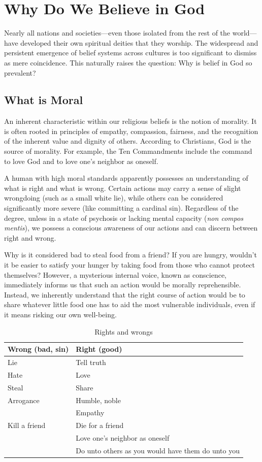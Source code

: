 \chapter{Why Do We Believe in God}
\label{chap:why-do-we-believe}

Nearly all nations and societies—even those isolated from the rest of the world—have developed their own spiritual deities that they worship. 
The widespread and persistent emergence of belief systems across cultures is too significant to dismiss as mere coincidence. 
This naturally raises the question: Why is belief in God so prevalent?

\section{What is Moral}

An inherent characteristic within our religious beliefs is the
notion of morality. It is often rooted in principles of empathy,
compassion, fairness, and the recognition of the inherent value
and dignity of others. According to Christians, God is the source
of morality. For example, the Ten Commandments include the command
to love God and to love one's neighbor as oneself.

A human with high moral standards apparently possesses an
understanding of what is right and what is wrong. Certain actions
may carry a sense of slight wrongdoing (such as a small white lie),
while others can be considered significantly more severe (like
committing a cardinal sin). Regardless of the degree, unless in a
state of psychosis or lacking mental capacity (\emph{non compos mentis}),
we possess a conscious awareness of our actions and can discern
between right and wrong.

Why is it considered bad to steal food from a friend? If you are
hungry, wouldn't it be easier to satisfy your hunger by taking food
from those who cannot protect themselves? However, a mysterious
internal voice, known as conscience, immediately informs us that
such an action would be morally reprehensible. Instead, we
inherently understand that the right course of action would be to
share whatever little food one has to aid the most vulnerable
individuals, even if it means risking our own well-being.

\begin{table}[h]
\centering
\caption{Rights and wrongs}
\begin{tabular}{|l|l|}
\hline
\textbf{Wrong (bad, sin)} & \textbf{Right (good)} \\
\hline
Lie & Tell truth \\
Hate & Love \\
Steal & Share \\
Arrogance & Humble, noble \\
 & Empathy \\
Kill a friend & Die for a friend \\
 & Love one's neighbor as oneself \\
 & Do unto others as you would have them do unto you \\
\hline
\end{tabular}
\end{table}

